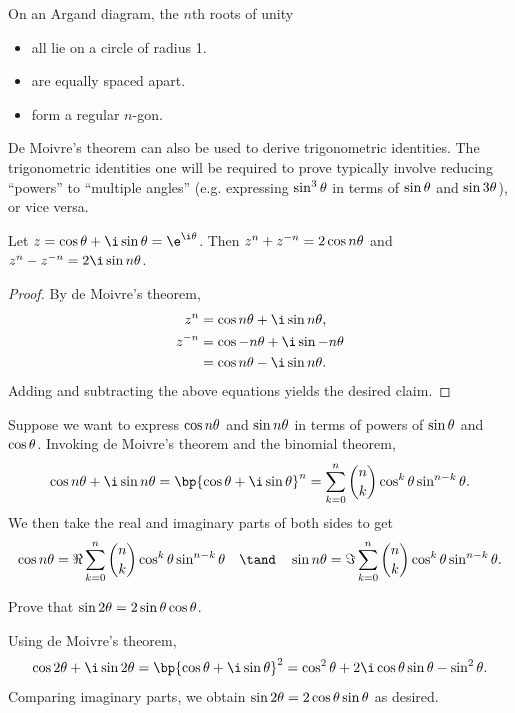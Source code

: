 \begin{fact}
    On an Argand diagram, the $n$th roots of unity
    \begin{itemize}
        \item all lie on a circle of radius 1.
        \item are equally spaced apart.
        \item form a regular $n$-gon.
    \end{itemize}
\end{fact}

De Moivre's theorem can also be used to derive trigonometric identities. The trigonometric identities one will be required to prove typically involve reducing ``powers'' to ``multiple angles'' (e.g. expressing $\sin^3 \theta$ in terms of $\sin \theta$ and $\sin 3\theta$), or vice versa.

\begin{proposition}
    Let $z = \cos \t + \i \sin \t = \e^{\i \t}$. Then $z^n + z^{-n} = 2\cos n\theta$ and $z^n - z^{-n} = 2\i \sin n\t$.
\end{proposition}
\begin{proof}
    By de Moivre's theorem,
    \begin{align*}
        z^n &= \cos{n\t} + \i \sin{n\t},\\
        z^{-n} &= \cos{-n\t} + \i \sin{-n\t}\\
        &= \cos{n\t} - \i \sin{n \t}.
    \end{align*}
    Adding and subtracting the above equations yields the desired claim.
\end{proof}

\begin{recipe}
    Suppose we want to express $\cos n\theta$ and $\sin n\theta$ in terms of powers of $\sin \theta$ and $\cos \theta$. Invoking de Moivre's theorem and the binomial theorem, \[\cos n\t + \i \sin n\t = \bp{\cos \t + \i \sin \t}^n = \sum_{k = 0}^n \binom{n}{k} \cos^k \t \sin^{n-k} \t.\] We then take the real and imaginary parts of both sides to get \[\cos n\t = \Re \sum_{k = 0}^n \binom{n}{k} \cos^k \t \sin^{n-k} \t \quad \tand \quad \sin n\t = \Im \sum_{k = 0}^n \binom{n}{k} \cos^k \t \sin^{n-k} \t.\]
\end{recipe}

\begin{sample}
    Prove that $\sin 2\theta = 2 \sin \theta \cos \theta$.
\end{sample}
\begin{sampans}
    Using de Moivre's theorem, \[\cos 2\t + \i \sin 2\t = \bp{\cos \t + \i \sin \t}^2 = \cos^2 \t + 2\i \cos \t \sin \t - \sin^2 \t.\] Comparing imaginary parts, we obtain $\sin 2\theta = 2\cos\theta\sin\theta$ as desired.
\end{sampans}

